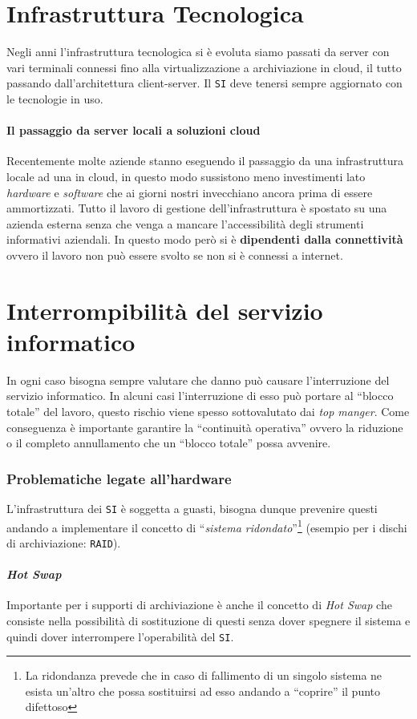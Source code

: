 \section{Infrastruttura Tecnologica}
    Negli anni l'infrastruttura tecnologica si è evoluta siamo passati da server con vari terminali connessi fino alla virtualizzazione a archiviazione in cloud, il tutto passando dall'architettura client-server. Il \texttt{SI} deve tenersi sempre aggiornato con le tecnologie in uso.
    \paragraph{Il passaggio da server locali a soluzioni cloud}
        Recentemente molte aziende stanno eseguendo il passaggio da una infrastruttura locale ad una in cloud, in questo modo sussistono meno investimenti lato \textit{hardware} e \textit{software} che ai giorni nostri invecchiano ancora prima di essere ammortizzati. Tutto il lavoro di gestione dell'infrastruttura è spostato su una azienda esterna senza che venga a mancare l'accessibilità degli strumenti informativi aziendali. In questo modo però si è \textbf{dipendenti dalla connettività} ovvero il lavoro non può essere svolto se non si è connessi a internet.
\section{Interrompibilità del servizio informatico}
    In ogni caso bisogna sempre valutare che danno può causare l'interruzione del servizio informatico. In alcuni casi l'interruzione di esso può portare al ``blocco totale'' del lavoro, questo rischio viene spesso sottovalutato dai \textit{top manger}. Come conseguenza è importante garantire la ``continuità operativa'' ovvero la riduzione o il completo annullamento che un ``blocco totale'' possa avvenire. 
    \subsubsection{Problematiche legate all'hardware}
        L'infrastruttura dei \texttt{SI} è soggetta a guasti, bisogna dunque prevenire questi andando a implementare il concetto di ``\textit{sistema ridondato}''\footnote{La ridondanza prevede che in caso di fallimento di un singolo sistema ne esista un'altro che possa sostituirsi ad esso andando a ``coprire'' il punto difettoso} (esempio per i dischi di archiviazione: \texttt{RAID}).
        \paragraph{\textit{Hot Swap}} Importante per i supporti di archiviazione è anche il concetto di \textit{Hot Swap} che consiste nella possibilità di sostituzione di questi senza dover spegnere il sistema e quindi dover interrompere l'operabilità del \texttt{SI}. 
